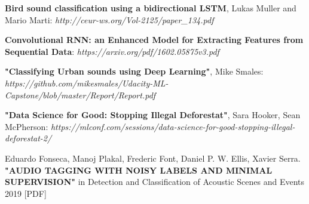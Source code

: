 \documentclass[11pt, a4papper]{report}
\theoremstyle{plain}
\theoremstyle{definition}
\theoremstyle{definition}
\theoremstyle{proposition}
\begin{document}
\begin{thebibliography}{1}
 \textbf{Bird sound classification using a bidirectional LSTM}, Lukas Muller and Mario Marti: \textit{http://ceur-ws.org/Vol-2125/paper\_134.pdf}

 \textbf{Convolutional RNN: an Enhanced Model for Extracting Features from Sequential Data}: \textit{https://arxiv.org/pdf/1602.05875v3.pdf}

 \textbf{"Classifying Urban sounds using Deep Learning"}, Mike Smales: \textit{https://github.com/mikesmales/Udacity-ML-Capstone/blob/master/Report/Report.pdf}

 \textbf{"Data Science for Good: Stopping Illegal Deforestat"}, Sara Hooker, Sean McPherson: \textit{https://mlconf.com/sessions/data-science-for-good-stopping-illegal-deforestat-2/}

 Eduardo Fonseca, Manoj Plakal, Frederic Font, Daniel P. W. Ellis, Xavier Serra.\\ \textbf{"AUDIO TAGGING WITH NOISY LABELS AND MINIMAL SUPERVISION"} in Detection and Classification of Acoustic Scenes and Events 2019 [PDF]
\end{thebibliography}
\end{document}
